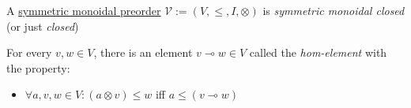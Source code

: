 A \hyperref[D2.2]{symmetric monoidal preorder} $\mathcal{V}:=(V,\leq,I,\otimes)$ is \emph{symmetric monoidal closed} (or just \emph{closed})

For every $v,w \in V$, there is an element $v \multimap w \in V$ called the \emph{hom-element} with the property:
\begin{itemize}
  \item  $\forall a,v,w \in V: (a \otimes v) \leq w$ iff $a \leq (v \multimap w)$
\end{itemize}
